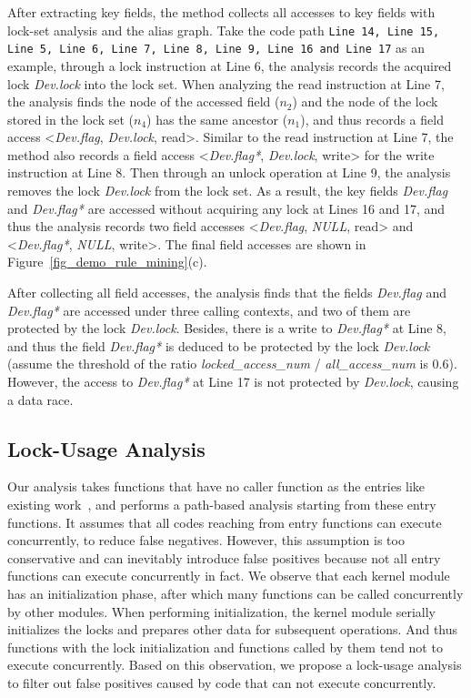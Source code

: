 After extracting key fields, the method collects all accesses to key fields 
with lock-set analysis and the alias graph. Take the code path {\tt Line 14, 
Line 15, Line 5, Line 6, Line 7, Line 8, Line 9, Line 16 and Line 17} as an 
example, through a lock instruction at Line 6, the analysis records the 
acquired lock {\em Dev.lock} into the lock set. When analyzing the read 
instruction at Line 7, the analysis finds the node of the accessed field 
($\mathit{n_2}$) and the node of the lock stored in the lock set 
($\mathit{n_4}$) has the same ancestor ($\mathit{n_1}$), and thus records a 
field access <{\em Dev.flag}, {\em Dev.lock}, read>. Similar to the read 
instruction at Line 7, the method also records a field access <{\em Dev.flag*}, 
{\em Dev.lock}, write> for the write instruction at Line 8. Then through an 
unlock operation at Line 9, the analysis removes the lock {\em Dev.lock} from 
the lock set. As a result, the key fields {\em Dev.flag} and {\em Dev.flag*} 
are accessed without acquiring any lock at Lines 16 and 17, and thus the 
analysis records two field accesses <{\em Dev.flag}, {\em NULL}, read> and 
<{\em Dev.flag*}, {\em NULL}, write>. The final field accesses are shown in 
Figure~\ref{fig_demo_rule_mining}(c).

After collecting all field accesses, the analysis finds that the fields {\em 
Dev.flag} and {\em Dev.flag*} are accessed under three calling contexts, and 
two of them are protected by the lock {\em Dev.lock}. Besides, there is a write 
to {\em Dev.flag*} at Line 8, and thus the field {\em Dev.flag*} is deduced to 
be protected by the lock {\em Dev.lock} (assume the threshold of the ratio {\em 
locked\_access\_num} / {\em all\_access\_num} is 0.6). However, the access to 
{\em Dev.flag*} at Line 17 is not protected by {\em Dev.lock}, causing a data 
race.

\subsection{Lock-Usage Analysis}
\label{subsec_lock_usage_analysis}
Our analysis takes functions that have no caller function as the entries like 
existing work~\cite{Li:ASPLOS22}, and performs a path-based analysis starting 
from these entry functions. It assumes that all codes reaching from entry 
functions can execute concurrently, to reduce false negatives. However, this 
assumption is too conservative and can inevitably introduce false positives 
because not all entry functions can execute concurrently in fact. We observe 
that each kernel module has an initialization phase, after which many functions 
can be called concurrently by other modules. When performing initialization, 
the kernel module serially initializes the locks and prepares other data for 
subsequent operations. And thus functions with the lock initialization and 
functions called by them tend not to execute concurrently. Based on this 
observation, we propose a lock-usage analysis to filter out false positives 
caused by code that can not execute concurrently.

